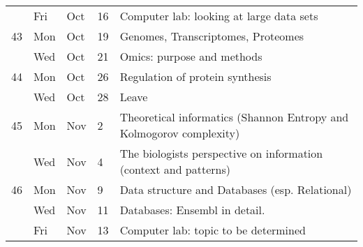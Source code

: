 \begin{tabu}{ l l l l| l}
  & Fri & Oct & 16 & Computer lab: looking at large data sets \\
  43 & Mon & Oct & 19 & Genomes, Transcriptomes, Proteomes \\
  & Wed & Oct & 21 & Omics: purpose and methods \\
  44 & Mon & Oct & 26 & Regulation of protein synthesis \\
  & Wed & Oct & 28 & Leave \\
  45 & Mon & Nov & 2 & Theoretical informatics (Shannon Entropy and Kolmogorov complexity)\\
  & Wed & Nov & 4 & The biologists perspective on information (context and patterns) \\
  46 & Mon & Nov & 9 & Data structure and Databases (esp. Relational) \\
  & Wed & Nov & 11 & Databases: Ensembl in detail.\\
  \rowfont{\color{blue!100}}  
  & Fri & Nov & 13 & Computer lab: topic to be determined \\
\end{tabu}
